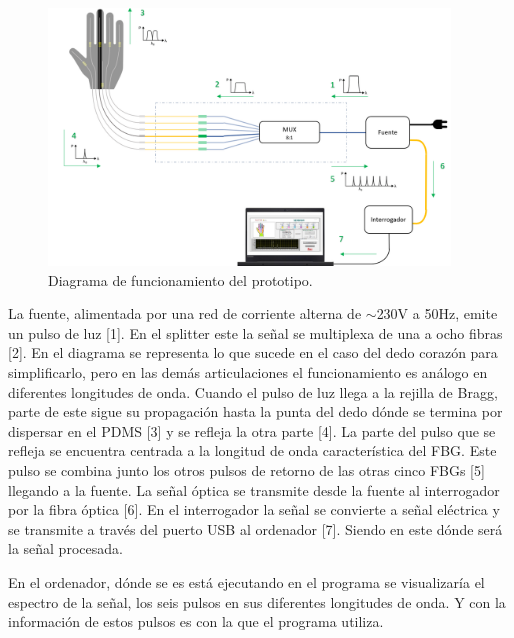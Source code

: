 \begin{figure}[H]
	\centering
	\includegraphics[width=0.95\textwidth]{./img/diagramaFBGfuncionamiento}
	\caption{Diagrama de funcionamiento del prototipo.} \label{fig:diagramaFBGfuncionamiento}
\end{figure}

La fuente, alimentada por una red de corriente alterna de $\sim$230V a 50Hz, emite un pulso de luz [1]. En el splitter este la señal se multiplexa de una a ocho fibras [2]. En el diagrama se representa lo que sucede en el caso del dedo corazón para simplificarlo, pero en las demás articulaciones el funcionamiento es análogo en diferentes longitudes de onda. Cuando el pulso de luz llega a la rejilla de Bragg, parte de este sigue su propagación hasta la punta del dedo dónde se termina por dispersar en el PDMS [3] y se refleja la otra parte [4]. La parte del pulso que se refleja se encuentra centrada a la longitud de onda característica del FBG. Este pulso se combina junto los otros pulsos de retorno de las otras cinco FBGs [5] llegando a la fuente. La señal óptica se transmite desde la fuente al interrogador por la fibra óptica [6]. En el interrogador la señal se convierte a señal eléctrica y se transmite a través del puerto USB al ordenador [7]. Siendo en este dónde será la señal procesada.

En el ordenador, dónde se es está ejecutando en el programa se visualizaría el espectro de la señal, los seis pulsos en sus diferentes longitudes de onda. Y con la información de estos pulsos es con la que el programa utiliza. 





